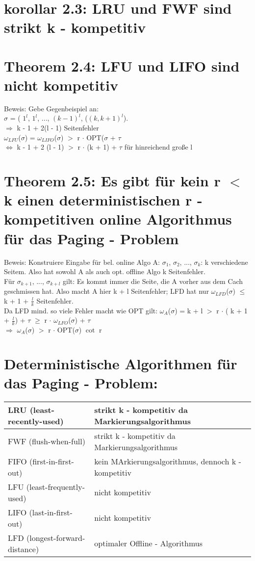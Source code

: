 \documentclass[a4paper]{article}
\begin{document}
\section*{korollar 2.3: LRU und FWF sind strikt k - kompetitiv}

\section*{Theorem 2.4: LFU und LIFO sind nicht kompetitiv}
Beweis: Gebe Gegenbeispiel an:\\
$\sigma$ = ( $1^l$, $1^l$, ..., $(k-1)^l$, ($(k, k+1)^l$). \\
$\Rightarrow$ k - 1 + 2(l - 1) Seitenfehler \\
$\omega_{LFU}$($\sigma$) = $\omega_{LIFO}$($\sigma$) $>$ r $\cdot$ OPT($\sigma$ + $\tau$ \\
$\Leftrightarrow$ k - 1 + 2 (l - 1) $>$ r $\cdot$ (k + 1) + $\tau$ für hinreichend große l

\section*{Theorem 2.5: Es gibt für kein r $<$ k einen deterministischen r - kompetitiven online Algorithmus für das Paging - Problem}
Beweis: Konstruiere Eingabe für bel. online Algo A: $\sigma_{1}$, $\sigma_{2}$, ..., $\sigma_{k}$: k verschiedene Seitem. Also hat sowohl A als auch opt. offline Algo k Seitenfehler.\\
Für $\sigma_{k + 1}$, ..., $\sigma_{k + l}$ gilt: Es kommt immer die Seite, die A vorher aus dem Cach geschmissen hat. Also macht A hier k + l Seitenfehler; LFD hat nur $\omega_{LFD}$($\sigma$) $\le$ k + 1 + $\tfrac{l}{k}$ Seitenfehler. \\
Da LFD mind. so viele Fehler macht wie OPT gilt: $\omega_{A}$($\sigma$) = k + l $>$ r $\cdot$ ( k + 1 + $\tfrac{l}{k}$) + $\tau$ $\ge$ r $\cdot$ $\omega_{LFO}$($\sigma$) + $\tau$ \\
 $\Rightarrow$  $\omega_{A}$($\sigma$) $>$ r $\cdot$ OPT($\sigma$) $\cot$ r

\section*{Deterministische Algorithmen für das Paging - Problem:}

 \begin{tabular}{| l | l |}
 \hline
  LRU (least-recently-used) 	& strikt k - kompetitiv da Markierungsalgorithmus \\ \hline
  FWF (flush-when-full)  		& strikt k - kompetitiv da Markierungsalgorithmus \\ \hline
  FIFO (first-in-first-out)  	& kein MArkierungsalgorithmus, dennoch k - kompetitiv \\ \hline
  LFU (least-frequently-used)   & nicht kompetitiv\\ \hline
  LIFO (last-in-first-out)  	& nicht kompetitiv\\ \hline
  LFD (longest-forward-distance)& optimaler Offline - Algorithmus \\ \hline
 \end{tabular}

 
\end{document}
